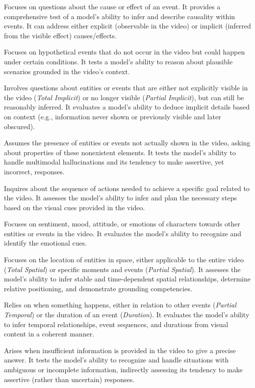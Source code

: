 \begin{description}[style=unboxed,leftmargin=0cm,noitemsep]
    \item[Causal.] {Focuses on questions about the cause or effect of an event. It provides a comprehensive test of a model's ability to infer and describe causality within events.  It can address either explicit (observable in the video) or implicit (inferred from the visible effect) causes/effects. }
    \item[Counterfactual.]{Focuses on hypothetical events that do not occur in the video but could happen under certain conditions. It tests a model's ability to reason about plausible scenarios grounded in the video's context.}
    \item[Implicit.] Involves questions about entities or events that are either not explicitly visible in the video (\textit{Total Implicit}) or no longer visible (\textit{Partial Implicit}), but can still be reasonably inferred. It evaluates a model's ability to deduce implicit details based on context (e.g., information never shown or previously visible and later obscured).
    \item[Out-of-scope.] Assumes the presence of entities or events not actually shown in the video, asking about properties of these nonexistent elements. It tests the model's ability to handle multimodal hallucinations and its tendency to make assertive, yet incorrect, responses.
    \item[Planning.] Inquires about the sequence of actions needed to achieve a specific goal related to the video. It assesses the model's ability to infer and plan the necessary steps based on the visual cues provided in the video.
    \item[Sentiment.] Focuses on sentiment, mood, attitude, or emotions of characters towards other entities or events in the video. It evaluates the model's ability to recognize and identify the emotional cues.
    \item[Spatial.] Focuses on the location of entities in space, either applicable to the entire video (\textit{Total Spatial}) or specific moments and events (\textit{Partial Spatial}). It assesses the model’s ability to infer stable and time-dependent spatial relationships, determine relative positioning, and demonstrate grounding competencies.
    \item[Temporal.] Relies on when something happens, either in relation to other events (\textit{Partial Temporal}) or the duration of an event (\textit{Duration}). It evaluates the model's ability to infer temporal relationships, event sequences, and durations from visual content in a coherent manner.
    \item[Uncertainty.] Arises when insufficient information is provided in the video to give a precise answer. It tests the model's ability to recognize and handle situations with ambiguous or incomplete information, indirectly assessing its tendency to make assertive (rather than uncertain) responses.
\end{description}

